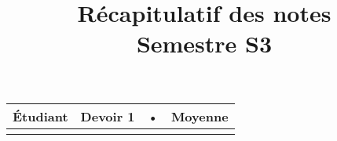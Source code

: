 \documentclass[12pt,a4paper, landscape]{article}
\title{Récapitulatif des notes \\ Semestre S3 }
\begin{document}
\maketitle
\begin{longtable}{|p{5cm}|p{2cm}|p{2cm}|p{2cm}|}
\hline 
Étudiant & Devoir 1 & • & Moyenne \\ 
\hline 
 &  &  &  \\ 
\hline 
\end{longtable} 
\end{document}
